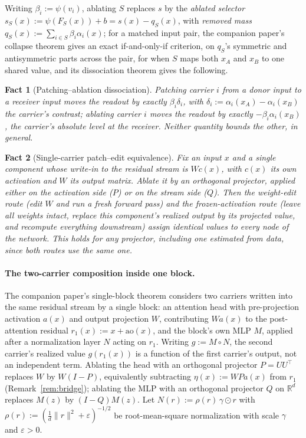\documentclass[11pt,a4paper]{article}
\newtheorem{fact}{Fact}
\begin{document}
Writing $\beta_i:=\psi(v_i)$, ablating $S$ replaces $s$ by the \emph{ablated
selector} $s_S(x):=\psi(F_S(x))+b=s(x)-q_S(x)$, with \emph{removed mass}
$q_S(x):=\sum_{i\in S}\beta_i\alpha_i(x)$; for a matched input pair, the
companion paper's collapse theorem gives an exact if-and-only-if criterion,
on $q_S$'s symmetric and antisymmetric parts across the pair, for when $S$
maps both $x_A$ and $x_B$ to one shared value, and its dissociation theorem
gives the following.

\begin{fact}[Patching--ablation dissociation]
\label{thm:dissociation}
Patching carrier $i$ from a donor input to a receiver input moves the readout
by exactly $\beta_i\delta_i$, with $\delta_i:=\alpha_i(x_A)-\alpha_i(x_B)$ the
carrier's \emph{contrast}; ablating carrier $i$ moves the readout by exactly
$-\beta_i\alpha_i(x_B)$, the carrier's \emph{absolute level} at the receiver.
Neither quantity bounds the other, in general.
\end{fact}

\begin{fact}[Single-carrier patch--edit equivalence]
\label{prop:patchedit}
Fix an input $x$ and a single component whose write-in to the residual
stream is $Wc(x)$, with $c(x)$ its own activation and $W$ its output matrix.
Ablate it by an orthogonal projector, applied either on the activation side
($P$) or on the stream side ($Q$). Then the \emph{weight-edit} route (edit
$W$ and run a fresh forward pass) and the \emph{frozen-activation} route
(leave all weights intact, replace this component's realized output by its
projected value, and recompute everything downstream) assign identical
values to every node of the network. This holds for any projector, including
one estimated from data, since both routes use the same one.
\end{fact}

\paragraph{The two-carrier composition inside one block.} The companion
paper's single-block theorem considers two carriers written into the same
residual stream by a single block: an attention head with pre-projection
activation $a(x)$ and output projection $W$, contributing $Wa(x)$ to the
post-attention residual $r_1(x):=x+\mathrm{ao}(x)$, and the block's own MLP
$M$, applied after a normalization layer $N$ acting on $r_1$. Writing
$g:=M\circ N$, the second carrier's realized value $g(r_1(x))$ is a function
of the first carrier's output, not an independent term. Ablating the head
with an orthogonal projector $P=UU^\top$ replaces $W$ by $W(I-P)$,
equivalently subtracting $\eta(x):=WPa(x)$ from $r_1$
(Remark~\ref{rem:bridge}); ablating the MLP with an orthogonal projector $Q$
on $\mathbb R^d$ replaces $M(z)$ by $(I-Q)M(z)$. Let
$N(r):=\rho(r)\,\gamma\odot r$ with
$\rho(r):=(\tfrac1d\|r\|^2+\varepsilon)^{-1/2}$ be root-mean-square
normalization with scale $\gamma$ and $\varepsilon>0$.
\end{document}
